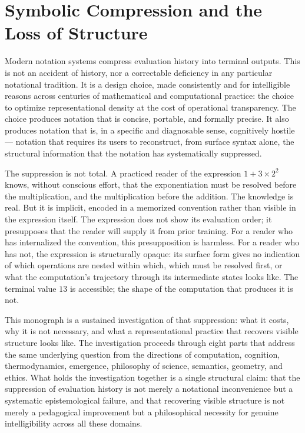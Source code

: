 \documentclass[12pt,openany]{book}
\theoremstyle{plain}
\theoremstyle{definition}
\theoremstyle{remark}
\begin{document}
\section*{Symbolic Compression and the Loss of Structure}

Modern notation systems compress evaluation history into terminal outputs. This is not an accident of history, nor a correctable deficiency in any particular notational tradition. It is a design choice, made consistently and for intelligible reasons across centuries of mathematical and computational practice: the choice to optimize representational density at the cost of operational transparency. The choice produces notation that is concise, portable, and formally precise. It also produces notation that is, in a specific and diagnosable sense, cognitively hostile — notation that requires its users to reconstruct, from surface syntax alone, the structural information that the notation has systematically suppressed.

The suppression is not total. A practiced reader of the expression $1 + 3 \times 2^2$ knows, without conscious effort, that the exponentiation must be resolved before the multiplication, and the multiplication before the addition. The knowledge is real. But it is implicit, encoded in a memorized convention rather than visible in the expression itself. The expression does not show its evaluation order; it presupposes that the reader will supply it from prior training. For a reader who has internalized the convention, this presupposition is harmless. For a reader who has not, the expression is structurally opaque: its surface form gives no indication of which operations are nested within which, which must be resolved first, or what the computation's trajectory through its intermediate states looks like. The terminal value $13$ is accessible; the shape of the computation that produces it is not.

This monograph is a sustained investigation of that suppression: what it costs, why it is not necessary, and what a representational practice that recovers visible structure looks like. The investigation proceeds through eight parts that address the same underlying question from the directions of computation, cognition, thermodynamics, emergence, philosophy of science, semantics, geometry, and ethics. What holds the investigation together is a single structural claim: that the suppression of evaluation history is not merely a notational inconvenience but a systematic epistemological failure, and that recovering visible structure is not merely a pedagogical improvement but a philosophical necessity for genuine intelligibility across all these domains.
\end{document}
